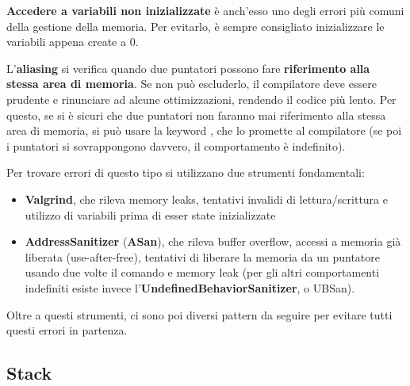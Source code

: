 \documentclass[11pt, a4paper, titlepage, oneside]{scrbook}
\begin{document}
\begin{Definizione}
\label{def-variabili-non-inizializate}
\textbf{Accedere a variabili non inizializzate} è anch'esso uno degli errori più comuni della gestione della memoria. Per evitarlo, è sempre consigliato inizializzare le variabili appena create a 0.
\end{Definizione}

\begin{Definizione}[Aliasing]
\label{def-aliasing}
L'\textbf{aliasing} si verifica quando due puntatori possono fare \textbf{riferimento alla stessa area di memoria}. Se non può escluderlo, il compilatore deve essere prudente e rinunciare ad alcune ottimizzazioni, rendendo il codice più lento. Per questo, se si è sicuri che due puntatori non faranno mai riferimento alla stessa area di memoria, si può usare la keyword , che lo promette al compilatore (se poi i puntatori si sovrappongono davvero, il comportamento è indefinito). 
\end{Definizione}

Per trovare errori di questo tipo si utilizzano due strumenti fondamentali:
\begin{itemize}
    \item \textbf{Valgrind}, che rileva memory leaks, tentativi invalidi di lettura/scrittura e utilizzo di variabili prima di esser state inizializzate
    \item \textbf{AddressSanitizer} (\textbf{ASan}), che rileva buffer overflow, accessi a memoria già liberata (use-after-free), tentativi di liberare la memoria da un puntatore usando due volte il comando  e memory leak (per gli altri comportamenti indefiniti esiste invece l'\textbf{UndefinedBehaviorSanitizer}, o UBSan).
\end{itemize}

Oltre a questi strumenti, ci sono poi diversi pattern da seguire per evitare tutti questi errori in partenza.

\subsection{Stack}
\end{document}
